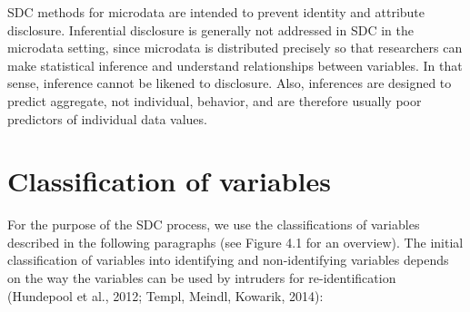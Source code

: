\documentclass[letterpaper,10pt,english]{sphinxmanual}
\begin{document}
SDC methods for microdata are intended to prevent identity and attribute
disclosure. Inferential disclosure is generally not addressed in SDC in
the microdata setting, since microdata is distributed precisely so that
researchers can make statistical inference and understand relationships
between variables. In that sense, inference cannot be likened to
disclosure. Also, inferences are designed to predict aggregate, not
individual, behavior, and are therefore usually poor predictors of
individual data values.


\section{Classification of variables}
\label{\detokenize{measure_risk:classification-of-variables}}
For the purpose of the SDC process, we use the classifications of
variables described in the following paragraphs (see Figure 4.1 for an
overview). The initial classification of variables into identifying and
non-identifying variables depends on the way the variables can be used
by intruders for re-identification (Hundepool et al., 2012; Templ,
Meindl, Kowarik, 2014):
\end{document}
